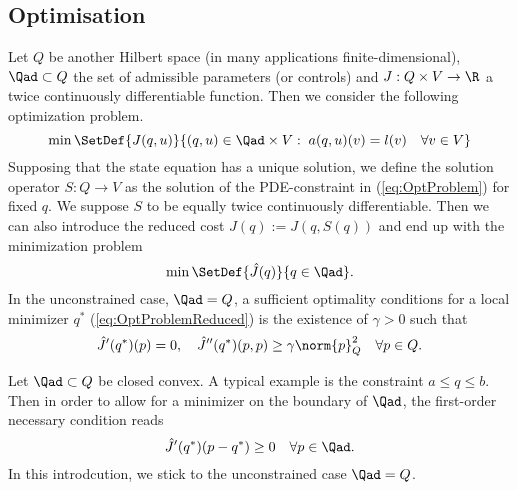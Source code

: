 %
\subsection{Optimisation}\label{subsec:Optimization}
%
Let $Q$ be another Hilbert space (in many applications finite-dimensional), $\Qad\subset Q$ the set of admissible parameters (or controls) and $J:Q\times V \to \R$ a twice continuously differentiable function.
Then we consider the following optimization problem.
%
\begin{equation}\label{eq:OptProblem}
\min\SetDef{J(q,u)}{  (q,u)\in \Qad\times V:\; a(q,u)(v) = l(v)\quad\forall v\in V}
\end{equation}
%
Supposing that the state equation has a unique solution, we define the solution operator $S:Q\to V$ as 
the solution of the PDE-constraint in (\ref{eq:OptProblem}) for fixed $q$. We suppose 
 $S$ to be equally twice continuously differentiable.
Then we can also introduce the reduced cost $\hat J(q) := J(q,S(q))$ and end up with the minimization problem
%
\begin{equation}\label{eq:OptProblemReduced}
\min\SetDef{\hat J(q) }{q\in \Qad}.
\end{equation}
%
In the unconstrained case, $\Qad= Q$, a sufficient optimality conditions for a local minimizer $q^*$ (\ref{eq:OptProblemReduced}) is the existence of $\gamma>0$ such that
%
\begin{equation}\label{eq:SOCondition}
{\hat J}'(q^*)(p) = 0,\quad {\hat J}''(q^*)(p,p)\ge \gamma \norm{p}_Q^2\quad \forall p\in Q.
\end{equation}
%
\begin{remark}\label{rmk:}
Let $\Qad\subset Q$ be closed convex. A typical example is the constraint $a\le q \le b$. Then in order to allow for a minimizer on the boundary of $\Qad$, the first-order necessary condition reads
%
\begin{equation}\label{eq:FOnec}
\hat J'(q^*)(p-q^*) \ge 0\quad \forall p\in \Qad.
\end{equation}
%
In this introdcution, we stick to the unconstrained case $\Qad= Q$.
\end{remark}
%

